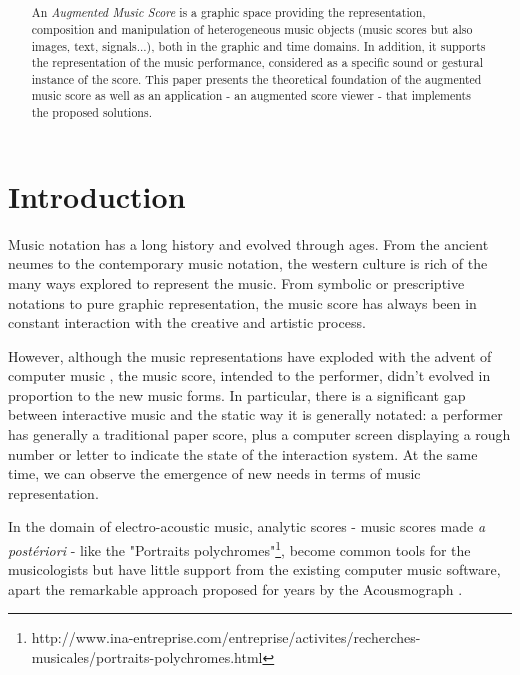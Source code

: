 \documentclass{article}
\title{\textsc{\papertitle}}
\begin{document}
%
\capstartfalse
\maketitle
\capstarttrue
%
\begin{abstract}
An \emph{Augmented Music Score} is a graphic space providing the representation, composition and manipulation of heterogeneous music objects (music scores but also images, text, signals...), both in the graphic and time domains. In addition, it supports the representation of the music performance, considered as a specific sound or gestural instance of the score. This paper presents the theoretical foundation of the augmented music score as well as an application - an augmented score viewer - that implements the proposed solutions.
\end{abstract}
%

\section{Introduction}\label{sec:introduction}

Music notation has a long history and evolved through ages. From the ancient neumes to the contemporary music notation, the western culture is rich of the many ways explored to represent the music. From symbolic or prescriptive notations to pure graphic representation, the music score has always been in constant interaction with the creative and artistic process. 

However, although the music representations have exploded with the advent of computer music \cite{dann93b,selfridge-field97,hewlett01}, the music score, intended to the performer, didn't evolved in proportion to the new music forms. In particular, there is a significant gap between interactive music and the static way it is generally notated: a performer has generally a traditional paper score, plus a computer screen displaying a rough number or letter to indicate the state of the interaction system. 
At the same time, we can observe the emergence of new needs in terms of music representation. 

In the domain of electro-acoustic music, analytic scores - music scores made \emph{a postériori} - like the "Portraits polychromes"\footnote{http://www.ina-entreprise.com/entreprise/activites/recherches-musicales/portraits-polychromes.html}, become common tools for the musicologists but have little support from the existing computer music software, apart the remarkable approach proposed for years by the Acousmograph \cite{ACOUSM04,ACOUSM91}. 
\end{document}
